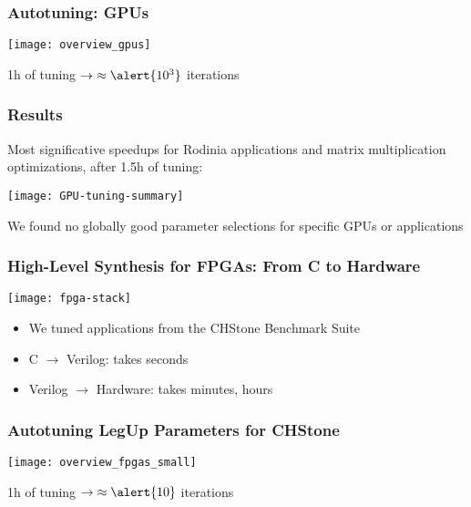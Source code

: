 \documentclass[10pt, compress, aspectratio=169, xcolor=table]{beamer}
\begin{document}
\begin{frame}
    \frametitle{Autotuning: GPUs}
    \begin{center}
        \texttt{[image: overview\_gpus]}

        \vspace{.3cm}

        \alert{1h} of tuning $\rightarrow \; \approx \alert{10^3}$ \alert{iterations}
    \end{center}
\end{frame}


\begin{frame}
    \frametitle{Results}
    \alert{Most significative speedups} for \alert{Rodinia applications}
    and \alert{matrix multiplication optimizations}, after \alert{1.5h of tuning}:

    \begin{center}
        \texttt{[image: GPU-tuning-summary]}
    \end{center}

    We \alert{found no globally good parameter selections} for specific GPUs or applications
\end{frame}

\begin{frame}
    \frametitle{High-Level Synthesis for FPGAs: From C to Hardware}
    \begin{center}
        \texttt{[image: fpga-stack]}
    \end{center}

    \begin{itemize}
        \item We tuned applications from the \alert{CHStone Benchmark Suite}
        \item C $\rightarrow$ Verilog: takes \alert{seconds}
        \item Verilog $\rightarrow$ Hardware: takes \alert{minutes}, \alert{hours}
    \end{itemize}
\end{frame}

\begin{frame}
    \frametitle{Autotuning LegUp Parameters for CHStone}
    \begin{center}
        \texttt{[image: overview\_fpgas\_small]}

        \vspace{.3cm}

         \alert{1h} of tuning $\rightarrow \; \approx \alert{10}$ \alert{iterations}
    \end{center}
\end{frame}
\end{document}
